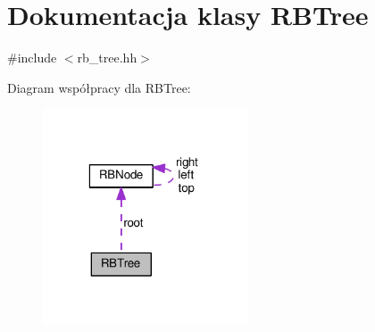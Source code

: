 \hypertarget{class_r_b_tree}{\section{Dokumentacja klasy R\-B\-Tree}
\label{class_r_b_tree}
}


{\ttfamily \#include $<$rb\-\_\-tree.\-hh$>$}



Diagram współpracy dla R\-B\-Tree\-:
\nopagebreak
\begin{figure}[H]
\begin{center}
\leavevmode
\includegraphics[width=172pt]{class_r_b_tree__coll__graph}
\end{center}
\end{figure}
